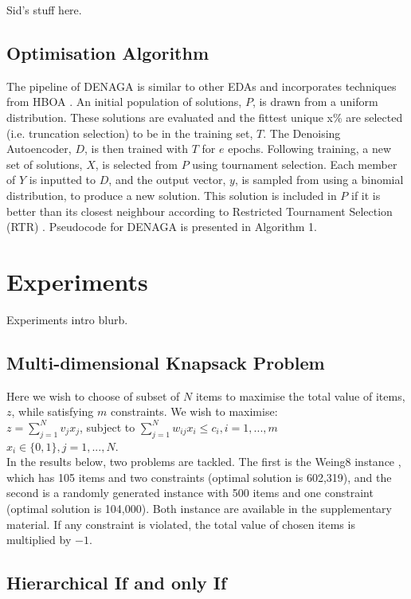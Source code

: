 \documentclass[runningheads,a4paper]{llncs}
\begin{document}
Sid's stuff here.

\subsection{Optimisation Algorithm}

The pipeline of DENAGA is similar to other EDAs and incorporates techniques from HBOA \cite{hboa}. An initial population of solutions, \(P\), is drawn from a uniform distribution. These solutions are evaluated and the fittest unique x\% are selected (i.e. truncation selection) to be in the training set, \(T\). The Denoising Autoencoder, \(D\), is then trained with \(T\) for \(e\) epochs. Following training, a new set of solutions, \(X\), is selected from \(P\) using tournament selection. Each member of \(Y\) is inputted to \(D\), and the output vector, \(y\), is sampled from using a binomial distribution, to produce a new solution. This solution is included in \(P\) if it is better than its closest neighbour according to Restricted Tournament Selection (RTR) \cite{hboa}. Pseudocode for DENAGA is presented in Algorithm 1.

\section{Experiments}

Experiments intro blurb.

\subsection{Multi-dimensional Knapsack Problem}
Here we wish to choose of subset of \(N\) items to maximise the total value of items, \(z\), while satisfying \(m\) constraints. We wish to maximise:\\  \(z = \sum_{j=1}^{N} v_jx_j\), subject to \(\sum_{j=1}^{N} w_{ij}x_i \leq c_i, i = 1, ..., m\)\\ \(x_i \in \{0,1\}, j = 1, ..., N\).\\ In the results below, two problems are tackled. The first is the Weing8 instance \cite{ref}, which has 105 items and two constraints (optimal solution is 602,319), and the second is a randomly generated instance with 500 items and one constraint (optimal solution is 104,000). Both instance are available in the supplementary material. If any constraint is violated, the total value of chosen items is multiplied by \(-1\).
\subsection{Hierarchical If and only If}
\end{document}
